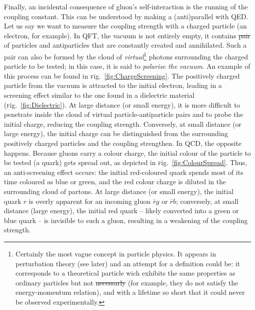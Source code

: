 \documentclass[ALICE,manyauthors]{cernphprep}
\newcommand{\Fig}       {\textsc{f}ig.~}
\newcommand{\fig}       {\Fig}
\providecommand{\DIFaddtex}[1]{{\protect\color{blue}\uwave{#1}}} %
\providecommand{\DIFdeltex}[1]{{\protect\color{red}\sout{#1}}}                      %
\providecommand{\DIFaddbegin}{} %
\providecommand{\DIFaddend}{} %
\providecommand{\DIFdelbegin}{} %
\providecommand{\DIFdelend}{} %
\providecommand{\DIFadd}[1]{\texorpdfstring{\DIFaddtex{#1}}{#1}} %
\providecommand{\DIFdel}[1]{\texorpdfstring{\DIFdeltex{#1}}{}} %
\newcommand{\DIFscaledelfig}{0.5}
\newlength{\DIFdelgraphicswidth} %
\newlength{\DIFdelgraphicsheight} %
\newcommand{\DIFaddincludegraphics}[2][]{{\color{blue}\fbox{\DIFOincludegraphics[#1]{#2}}}} %
\newcommand{\DIFdelincludegraphics}[2][]{%
\sbox{\DIFdelgraphicsbox}{\DIFOincludegraphics[#1]{#2}}%
\settoboxwidth{\DIFdelgraphicswidth}{\DIFdelgraphicsbox} %
\settoboxtotalheight{\DIFdelgraphicsheight}{\DIFdelgraphicsbox} %
\scalebox{\DIFscaledelfig}{%
\parbox[b]{\DIFdelgraphicswidth}{\usebox{\DIFdelgraphicsbox}\\[-\baselineskip] \rule{\DIFdelgraphicswidth}{0em}}\llap{\resizebox{\DIFdelgraphicswidth}{\DIFdelgraphicsheight}{%
\setlength{\unitlength}{\DIFdelgraphicswidth}%
\begin{picture}(1,1)%
\thicklines\linethickness{2pt} %
{\color[rgb]{1,0,0}\put(0,0){\framebox(1,1){}}}%
{\color[rgb]{1,0,0}\put(0,0){\line( 1,1){1}}}%
{\color[rgb]{1,0,0}\put(0,1){\line(1,-1){1}}}%
\end{picture}%
}\hspace*{3pt}}} %
} %
\DeclareRobustCommand{\DIFaddbegin}{\DIFOaddbegin \let\includegraphics\DIFaddincludegraphics} %
\DeclareRobustCommand{\DIFaddend}{\DIFOaddend \let\includegraphics\DIFOincludegraphics} %
\DeclareRobustCommand{\DIFdelbegin}{\DIFOdelbegin \let\includegraphics\DIFdelincludegraphics} %
\DeclareRobustCommand{\DIFdelend}{\DIFOaddend \let\includegraphics\DIFOincludegraphics} %
\begin{document}
Finally, an incidental consequence of gluon's self-interaction is the running of the coupling constant. This can be understood by making a (anti)parallel with QED. Let us say we want to measure the coupling strength with a charged particle (an electron, for example). In QFT, the vacuum is not entirely empty, it contains \DIFdelbegin \DIFdel{pair }\DIFdelend \DIFaddbegin \DIFadd{pairs }\DIFaddend of particles and antiparticles that are constantly created and annihilated. Such a pair can also be formed by the cloud of \textit{virtual}\footnote{Certainly the most vague concept in particle physics. It appears in perturbation theory (see later) and an attempt for a definition could be: it corresponds to a theoretical particle wich exhibits the same properties as ordinary particles but not \DIFdelbegin \DIFdel{necessarly }\DIFdelend \DIFaddbegin \DIFadd{necessarily }\DIFaddend (for example, they do not satisfy the energy-momentum relation), and with a lifetime so short that it could never be observed experimentally.} photons surrounding the charged particle to be tested; in this case, it is said to \textit{polarise the vacuum}. An example of this process can be found in \fig\ref{fig:ChargeScreening}. The positively charged particle from the vacuum is attracted to the initial electron, leading in a screening effect similar to the one found in a dielectric material (\fig\ref{fig:Dielectric}). At large distance (or small energy), it is more difficult to penetrate inside the cloud of virtual particle-antiparticle pairs and to probe the initial charge, reducing the coupling strength. Conversely, at small distance (or large energy), the initial charge can be distinguished from the surrounding positively charged particles and the coupling strengthen. In QCD, the opposite happens.  Because gluons carry a colour charge, the initial colour of the particle to be tested (a quark) gets spread out, as depicted in \fig\ref{fig:ColourSpread}. Thus, an anti-screening effect occurs: the initial red-coloured quark spends most of its time coloured as blue or green, and the red colour charge is diluted in the surrounding cloud of partons. At large distance (or small energy), the initial quark $r$ is overly apparent for an incoming gluon $\bar{r}g$ or $\bar{r}b$; conversely, at small distance (large energy), the initial red quark -- likely converted into a green or blue quark -- is invisible to such a gluon, resulting in a weakening of the coupling strength. \\
\end{document}
